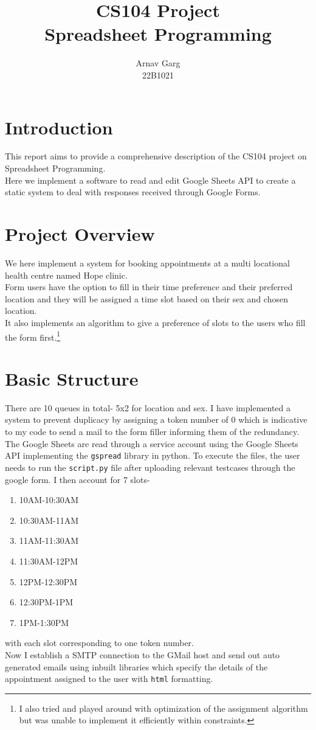 \documentclass{article}
\title{CS104 Project \\ Spreadsheet Programming}
\author{Arnav Garg\\22B1021}
\date{}
\begin{document}
\maketitle
\tableofcontents
\clearpage

\section{Introduction}
This report aims to provide a comprehensive description of the CS104 project on Spreadsheet Programming.\\
Here we implement a software to read and edit Google Sheets API to create a static system to deal with responses received through Google Forms.
\section{Project Overview}
We here implement a system for booking appointments at a multi locational health centre named Hope clinic. \\Form users have the option to fill in their time preference and their preferred location and they will be assigned a time slot based on their sex and chosen location. \\It also implements an algorithm to give a preference of slots to the users who fill the form first.\footnote{I also tried and played around with optimization of the assignment algorithm but was unable to implement it efficiently within constraints.}
\section{Basic Structure}
There are 10 queues in total- 5x2 for location and sex. I have implemented a system to prevent duplicacy by assigning a token number of 0 which is indicative to my code to send a mail to the form filler informing them of the redundancy.
The Google Sheets are read through a service account using the Google Sheets API\autocite{1} implementing the \texttt{gspread}\autocite{4} library in python. To execute the files, the user needs to run the \texttt{script.py} file after uploading relevant testcases through the google form.
I then account for 7 slots-
\begin{enumerate}
    \item 10AM-10:30AM
    \item 10:30AM-11AM
    \item 11AM-11:30AM
    \item 11:30AM-12PM
    \item 12PM-12:30PM
    \item 12:30PM-1PM
    \item 1PM-1:30PM
\end{enumerate}
with each slot corresponding to one token number.\\
Now I establish a SMTP connection to the GMail host \autocite{2} and send out auto generated emails using inbuilt libraries which specify the details of the appointment assigned to the user with \texttt{html} formatting.
\end{document}
